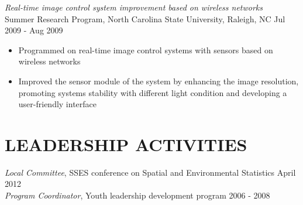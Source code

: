 \documentclass[10pt]{res} %
\begin{document}
\begin{resume}
{\sl Real-time image control system improvement based on wireless networks} \\
Summer Research Program, North Carolina State University, Raleigh, NC \hfill Jul 2009 - Aug 2009
\begin{itemize} \itemsep -2pt
\item Programmed on real-time image control systems with sensors based on wireless networks
\item Improved the sensor module of the system by enhancing the image
  resolution, promoting systems stability with different light condition and developing a user-friendly interface
\end{itemize}












\section{LEADERSHIP ACTIVITIES}
\vspace{6pt} %
{\sl Local Committee}, SSES conference on Spatial and Environmental Statistics
    \hfill April 2012 \\
{\sl Program Coordinator}, Youth leadership development program \hfill 2006 - 2008


\end{resume}
\end{document}
